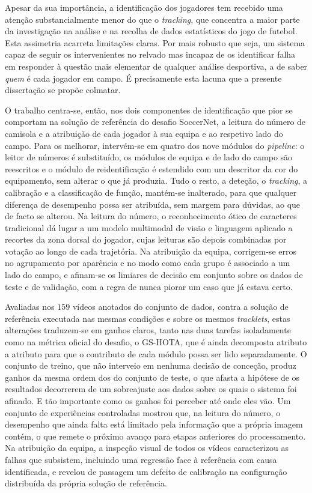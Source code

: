 Apesar da sua importância, a identificação dos jogadores tem recebido uma atenção substancialmente
menor do que o \emph{tracking}, que concentra a maior parte da investigação na análise e na recolha
de dados estatísticos do jogo de futebol. Esta assimetria acarreta limitações claras. Por mais
robusto que seja, um sistema capaz de seguir os intervenientes no relvado mas incapaz de os
identificar falha em responder à questão mais elementar de qualquer análise desportiva, a de saber
\emph{quem} é cada jogador em campo. É precisamente esta lacuna que a presente dissertação se propõe
colmatar.

O trabalho centra-se, então, nos dois componentes de identificação que pior se comportam na
solução de referência do desafio SoccerNet, a leitura do número de camisola e a atribuição de cada
jogador à sua equipa e ao respetivo lado do campo. Para os melhorar, intervém-se em quatro dos nove
módulos do \emph{pipeline}: o leitor de números é substituído, os módulos de equipa e de lado do
campo são reescritos e o módulo de reidentificação é estendido com um descritor da cor do
equipamento, sem alterar o que já produzia. Tudo o resto, a deteção, o \emph{tracking}, a
calibração e a classificação de função, mantém-se inalterado, para que qualquer diferença de
desempenho possa ser atribuída, sem margem para dúvidas, ao que de facto se alterou. Na leitura do
número, o reconhecimento ótico de caracteres tradicional dá lugar a um modelo multimodal de visão e
linguagem aplicado a recortes da zona dorsal do jogador, cujas leituras são depois combinadas por
votação ao longo de cada trajetória. Na atribuição da equipa, corrigem-se erros no agrupamento por
aparência e no modo como cada grupo é associado a um lado do campo, e afinam-se os limiares de
decisão em conjunto sobre os dados de teste e de validação, com a regra de nunca piorar um caso que
já estava certo.

Avaliadas nos $159$ vídeos anotados do conjunto de dados, contra a solução de referência executada
nas mesmas condições e sobre os mesmos \emph{tracklets}, estas alterações traduzem-se em ganhos
claros, tanto nas duas tarefas isoladamente como na métrica oficial do desafio, o GS-HOTA, que é
ainda decomposta atributo a atributo para que o contributo de cada módulo possa ser lido
separadamente. O conjunto de treino, que não interveio em nenhuma decisão de conceção, produz
ganhos da mesma ordem dos do conjunto de teste, o que afasta a hipótese de os resultados decorrerem
de um sobreajuste aos dados sobre os quais o sistema foi afinado. E tão importante como os ganhos
foi perceber até onde eles vão. Um conjunto de experiências controladas mostrou que, na leitura do
número, o desempenho que ainda falta está limitado pela informação que a própria imagem contém, o
que remete o próximo avanço para etapas anteriores do processamento. Na atribuição da equipa, a
inspeção visual de todos os vídeos caracterizou as falhas que subsistem, incluindo uma regressão
face à referência com causa identificada, e revelou de passagem um defeito de calibração na
configuração distribuída da própria solução de referência.

